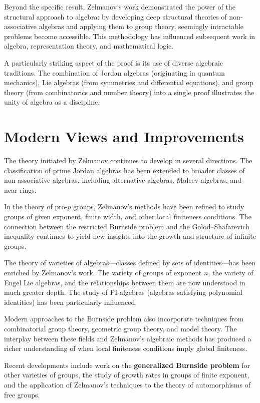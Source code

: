 Beyond the specific result, Zelmanov's work demonstrated the power
of the structural approach to algebra: by developing deep
structural theories of non-associative algebras and applying them
to group theory, seemingly intractable problems become accessible.
This methodology has influenced subsequent work in algebra,
representation theory, and mathematical logic.

A particularly striking aspect of the proof is its use of diverse
algebraic traditions.  The combination of Jordan algebras
(originating in quantum mechanics), Lie algebras (from symmetries
and differential equations), and group theory (from combinatorics
and number theory) into a single proof illustrates the unity of
algebra as a discipline.

\section{Modern Views and Improvements}

The theory initiated by Zelmanov continues to develop in several
directions.  The classification of prime Jordan algebras has been
extended to broader classes of non-associative algebras, including
alternative algebras, Malcev algebras, and near-rings.

In the theory of pro-$p$ groups, Zelmanov's methods have been
refined to study groups of given exponent, finite width, and other
local finiteness conditions.  The connection between the restricted
Burnside problem and the Golod--Shafarevich inequality continues to
yield new insights into the growth and structure of infinite groups.

The theory of varieties of algebras---classes defined by sets of
identities---has been enriched by Zelmanov's work.  The variety of
groups of exponent $n$, the variety of Engel Lie algebras, and the
relationships between them are now understood in much greater depth.
The study of PI-algebras (algebras satisfying polynomial
identities) has been particularly influenced.

Modern approaches to the Burnside problem also incorporate
techniques from combinatorial group theory, geometric group
theory, and model theory.  The interplay between these fields and
Zelmanov's algebraic methods has produced a richer understanding of
when local finiteness conditions imply global finiteness.

Recent developments include work on the \textbf{generalized Burnside
problem} for other varieties of groups, the study of growth rates
in groups of finite exponent, and the application of Zelmanov's
techniques to the theory of automorphisms of free groups.

